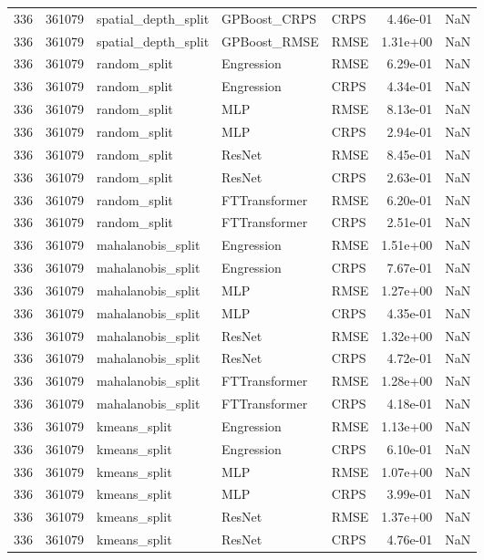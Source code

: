 \begin{tabular}{rrlllrr}
336 & 361079 & spatial\_depth\_split & GPBoost\_CRPS & CRPS & 4.46e-01 & NaN \\
336 & 361079 & spatial\_depth\_split & GPBoost\_RMSE & RMSE & 1.31e+00 & NaN \\
336 & 361079 & random\_split & Engression & RMSE & 6.29e-01 & NaN \\
336 & 361079 & random\_split & Engression & CRPS & 4.34e-01 & NaN \\
336 & 361079 & random\_split & MLP & RMSE & 8.13e-01 & NaN \\
336 & 361079 & random\_split & MLP & CRPS & 2.94e-01 & NaN \\
336 & 361079 & random\_split & ResNet & RMSE & 8.45e-01 & NaN \\
336 & 361079 & random\_split & ResNet & CRPS & 2.63e-01 & NaN \\
336 & 361079 & random\_split & FTTransformer & RMSE & 6.20e-01 & NaN \\
336 & 361079 & random\_split & FTTransformer & CRPS & 2.51e-01 & NaN \\
336 & 361079 & mahalanobis\_split & Engression & RMSE & 1.51e+00 & NaN \\
336 & 361079 & mahalanobis\_split & Engression & CRPS & 7.67e-01 & NaN \\
336 & 361079 & mahalanobis\_split & MLP & RMSE & 1.27e+00 & NaN \\
336 & 361079 & mahalanobis\_split & MLP & CRPS & 4.35e-01 & NaN \\
336 & 361079 & mahalanobis\_split & ResNet & RMSE & 1.32e+00 & NaN \\
336 & 361079 & mahalanobis\_split & ResNet & CRPS & 4.72e-01 & NaN \\
336 & 361079 & mahalanobis\_split & FTTransformer & RMSE & 1.28e+00 & NaN \\
336 & 361079 & mahalanobis\_split & FTTransformer & CRPS & 4.18e-01 & NaN \\
336 & 361079 & kmeans\_split & Engression & RMSE & 1.13e+00 & NaN \\
336 & 361079 & kmeans\_split & Engression & CRPS & 6.10e-01 & NaN \\
336 & 361079 & kmeans\_split & MLP & RMSE & 1.07e+00 & NaN \\
336 & 361079 & kmeans\_split & MLP & CRPS & 3.99e-01 & NaN \\
336 & 361079 & kmeans\_split & ResNet & RMSE & 1.37e+00 & NaN \\
336 & 361079 & kmeans\_split & ResNet & CRPS & 4.76e-01 & NaN \\

\end{tabular}
